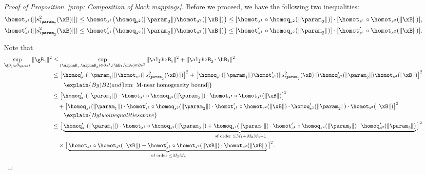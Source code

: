 \begin{proof}[Proof of Proposition~\ref{prop: Composition of block mappings}]

Before we proceed, we have the following two inequalities: 
\begin{align*}
    \homot_{s^1}(\|s^2_{\param_2}(\xB)\|) \le \homot_{s^1}\big(\homoq_{s^2}(\|\param_2\|) \homot_{s^2}(\|\xB\|)\big)\le  [ \homot_{s^1}\circ \homoq_{s^2}(\|\param_2\|)] \cdot [\homot_{s^1}\circ \homot_{s^2}(\|\xB\|)],\\ 
    \homot^\prime _{s^1}(\|s^2_{\param_2}(\xB)\|) \le \homot^\prime _{s^1}\big(\homoq_{s^2}(\|\param_2\|) \homot_{s^2}(\|\xB\|)\big)\le  [ \homot^\prime _{s^1}\circ \homoq_{s^2}(\|\param_2\|)] \cdot [\homot^\prime _{s^1}\circ \homot_{s^2}(\|\xB\|)]. 
\end{align*}


Note that 
\begin{align*}
\sup_{\gB_1 \in \partial_{\param} s} \|\gB_1\|^2 
&\le  \sup_{(\alphaB_1, \alphaB_2) \in \partial s^1, (\hB_1, \hB_2) \in \partial s^2} \|\alphaB_1\|^2 + \|\alphaB_2 \cdot \hB_1\|^2 
\\
&\le \big [ \homoq_{s^1}^\prime (\|\param_1\|) \homot_{s^1}(\|s^2_{\param_2}(\xB)\|) \big]^2  + \big [\homoq_{s^1} (\|\param_1\|) \homot_{s^1}^\prime (\|s^2_{\param_2}(\xB)\|) \homoq_{s^2}^\prime (\|\param_2\|) \homot_{s^2} (\|\xB\|)  \big]^2  
\\ 
&\qquad \explain{ By (B2) and \Cref{lem: M-near homogeneity bound}} 
\\
&\le \big [\homoq_{s^1}^\prime (\|\param_1\|) \cdot \homot_{s^1}\circ \homoq_{s^2}(\|\param_2\|) \cdot \homot_{s^1}\circ \homot_{s^2}(\|\xB\|) \big]^2\\ 
& \quad + \big [\homoq_{s^1} (\|\param_1\|) \cdot   \homot^\prime _{s^1}\circ \homoq_{s^2}(\|\param_2\|) \cdot \homot^\prime _{s^1}\circ \homot_{s^2}(\|\xB\|)\cdot  \homoq_{s^2}^\prime (\|\param_2\|)\cdot  \homot_{s^2} (\|\xB\|)  \big]^2\\ 
&\qquad \explain{ By two inequalities above } \\ 
&\le \big [ \underbrace{\homoq_{s^1}^\prime (\|\param_1\|) \cdot \homot_{s^1}\circ \homoq_{s^2}(\|\param_2\|) + \homoq_{s^1} (\|\param_1\|) \cdot   \homot^\prime _{s^1}\circ \homoq_{s^2}(\|\param_2\|)\cdot  \homoq_{s^2}^\prime (\|\param_2\|)}_{\text{ of order } \le  M_1 + M_2M_3-1} \big]^2 \\ 
&\quad \times \big [\underbrace{ \homot_{s^1}\circ \homot_{s^2}(\|\xB\|) +  \homot^\prime _{s^1}\circ \homot_{s^2}(\|\xB\|) \cdot \homot_{s^2} (\|\xB\|)}_{\text{ of order } \le M_2M_4} \big]^2. 
\end{align*}

\end{proof}
